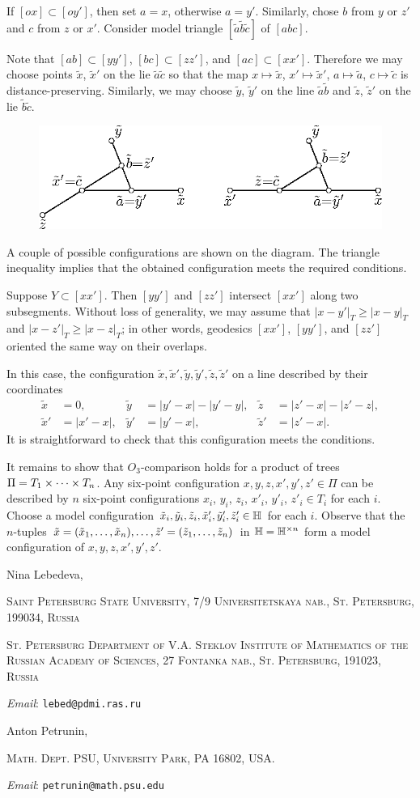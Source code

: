 \documentclass{article}
\makeatletter
\newcommand{\Addresses}{{\bigskip\footnotesize

\noindent Nina Lebedeva,
\par\nopagebreak
 \textsc{Saint Petersburg State University, 7/9 Universitetskaya nab., St. Petersburg, 199034, Russia}
\par
\nopagebreak
 \textsc{St. Petersburg Department of V.A. Steklov Institute of Mathematics of the Russian Academy of Sciences, 27 Fontanka nab., St. Petersburg, 191023, Russia}
  \par\nopagebreak
  \textit{Email}: \texttt{lebed@pdmi.ras.ru}

\medskip

\noindent   Anton Petrunin, 
\par\nopagebreak
 \textsc{Math. Dept. PSU, University Park, PA 16802, USA.}
  \par\nopagebreak
  \textit{Email}: \texttt{petrunin@math.psu.edu}
  
}}
\makeatother
\begin{document}
If $[ox]\subset [oy']$, then set $a=x$, otherwise $a=y'$.
Similarly, chose  $b$ from $y$ or $z'$ and $c$ from $z$ or $x'$.
Consider model triangle $[\tilde a\tilde b\tilde c]$ of $[abc]$.

Note that $[ab]\subset [yy']$, $[bc]\subset [zz']$, and $[ac]\subset [xx']$.
Therefore we may choose points $\tilde x$, $\tilde x'$ on the lie $\tilde a\tilde c$ so that the map $x\mapsto \tilde x$, $x'\mapsto \tilde x'$, $a\mapsto \tilde a$, $c\mapsto \tilde c$ is distance-preserving.
Similarly, we may choose $\tilde y$, $\tilde y'$ on the line $\tilde a\tilde b$ and $\tilde z$, $\tilde z'$ on the lie $\tilde b\tilde c$.
\begin{figure}[ht!]
\centering
\includegraphics{mppics/pic-50}
\end{figure}
A couple of possible configurations are shown on the diagram.
The triangle inequality implies that the obtained configuration meets the required conditions.

Suppose $Y\subset [xx']$.
Then $[yy']$ and $[zz']$ intersect $[xx']$ along two subsegments.
Without loss of generality, we may assume that $|x-y'|_T\ge |x-y|_T$ and $|x-z'|_T\ge |x-z|_T$;
in other words, geodesics $[xx']$, $[yy']$, and $[zz']$ oriented the same way on their overlaps.

In this case, the configuration $\tilde x,\tilde x',\tilde y,\tilde y',\tilde z,\tilde z'$ on a line described by their coordinates
\begin{align*}
\tilde x&=0,
&
\tilde y&=|y'-x|-|y'-y|,
&
\tilde z&=|z'-x|-|z'-z|,
\\
\tilde x'&=|x'-x|,
&
\tilde y'&=|y'-x|,
&
\tilde z'&=|z'-x|.
\end{align*}
It is straightforward to check that this configuration meets the conditions. 

It remains to show that $O_3$-comparison holds for a product of trees $\Pi\z=T_1\times \dots\times T_n$.
Any six-point configuration $x,y,z,x',y',z'\in \Pi$ can be described by $n$ six-point configurations $x_i$, $y_i$, $z_i$, $x'_i$, $y'_i$, $z'_i\in T_i$ for each $i$.
Choose a model configuration $\tilde x_i,\tilde y_i,\tilde z_i,\tilde x'_i,\tilde y'_i,\tilde z'_i\in \mathbb H$ for each $i$.
Observe that the $n$-tuples $\tilde x=(\tilde x_1,\dots, \tilde x_n),\z\dots,\tilde z'=(\tilde z_1,\dots, \tilde z_n)$ in $\mathbb H=\mathbb H^{\times n}$ form a model configuration of $x,y,z,x',y',z'$.
\qeds



{\sloppy
\printbibliography[heading=bibintoc]
\fussy
}

\Addresses
\end{document}
